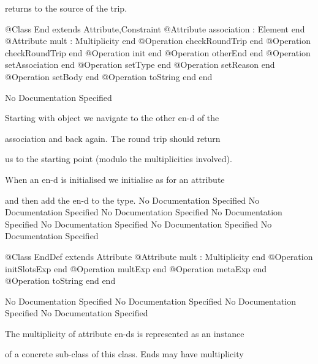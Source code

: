       returns to the source of the trip.
\begin{Interface}
@Class End extends Attribute,Constraint
  @Attribute association : Element end
  @Attribute mult : Multiplicity end
  @Operation checkRoundTrip end
  @Operation checkRoundTrip end
  @Operation init end
  @Operation otherEnd end
  @Operation setAssociation end
  @Operation setType end
  @Operation setReason end
  @Operation setBody end
  @Operation toString end
end
\end{Interface}
No Documentation Specified

        Starting with object we navigate to the other en-d of the

        association and back again. The round trip should return

        us to the starting point (modulo the multiplicities involved).

        When an en-d is initialised we initialise as for an attribute

        and then add the en-d to the type.
No Documentation Specified
No Documentation Specified
No Documentation Specified
No Documentation Specified
No Documentation Specified
No Documentation Specified
No Documentation Specified
\begin{Interface}
@Class EndDef extends Attribute
  @Attribute mult : Multiplicity end
  @Operation initSlotsExp end
  @Operation multExp end
  @Operation metaExp end
  @Operation toString end
end
\end{Interface}
No Documentation Specified
No Documentation Specified
No Documentation Specified
No Documentation Specified

      The multiplicity of attribute en-ds is represented as an instance

      of a concrete sub-class of this class. Ends may have multiplicity

